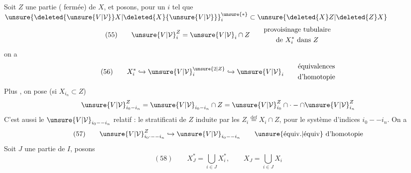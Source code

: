 Soit $Z$  une partie ( fermée)
de $X$, et posons, pour \deleted{$\unsure{\forall}$} un $i$ tel que
${\unsure{\deleted{{\unsure{V|\mathcal V}}}X|\deleted{X}{\unsure{V|\mathcal V}}}}_i^{\unsure{*}}
\subset\unsure{\deleted{X}Z|\deleted{Z}X}$
\[
(55)\qquad {\unsure{V|\mathcal V}}_i^Z
={\unsure{V|\mathcal V}}_i\cap Z\qquad
\begin{gathered}
\text{provoisinage tubulaire}\\
\text{de }X_i^*\text{ dans }Z
\end{gathered}
\]
on a
\[
(56)\qquad X_i^*\hookrightarrow
{\unsure{V|\mathcal V}}_i^{\unsure{2|Z}}\hookrightarrow{\unsure{V|\mathcal V}}_i
\qquad\begin{gathered}
\text{équivalences}\\
\text{d'homotopie}
\end{gathered}
\]
Plus , on pose (si $X_{i_n}\subset Z$)
\[
{\unsure{V|\mathcal V}}_{i_0-i_n}^Z
={\unsure{V|\mathcal V}}_{i_0-i_n}\cap Z
={\unsure{V|\mathcal V}}_{i_0}^Z\cap\cdot-\cap{\unsure{V|\mathcal V}}_{i_n}^Z
\]
C'est aussi le ${\unsure{V|\mathcal V}}_{i_0--i_n}$ relatif : le 
stratificati\unsure{-}
de $Z$ induite par les
$Z_i\overset{\mathrm{def}}{=}X_i\cap Z$, pour le système d'indices
$i_0--i_n$. On a
\[
(57)\qquad {\unsure{V|\mathcal V}}_{i_0\cdot--i_n}^Z
\hookrightarrow{\unsure{V|\mathcal V}}_{i_0--i_n}
\qquad\text{\unsure{équiv.|équiv} d'homotopie}
\]
Soit $J$ une partie de $I$, posons
\[
(58)\qquad X_J^*=\bigcup_{i\in J}X_i^*,\qquad X_J=\bigcup_{i\in J}X_i
\]
